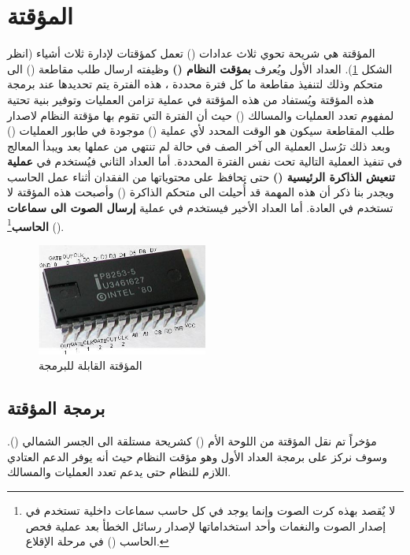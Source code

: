 \documentclass[document.tex]{subfiles}
\begin{document}
\section{المؤقتة }
المؤقتة هي شريحة  تحوي ثلاث عدادات () تعمل كمؤقتات لإدارة ثلاث أشياء (انظر الشكل \ref{fig:pit}). العداد الأول ويُعرف \textbf{بمؤقت النظام ()} وظيفته ارسال طلب مقاطعة () الى متحكم  وذلك لتنفيذ مقاطعة ما كل فترة محددة ، هذه الفترة يتم تحديدها عند برمجة هذه المؤقتة ويُستفاد من هذه المؤقتة في عملية تزامن العمليات وتوفير بنية تحتية لمفهوم تعدد العمليات والمسالك () حيث أن الفترة التي تقوم بها مؤقتة النظام لاصدار طلب المقاطعة سيكون هو الوقت المحدد لأي عملية () موجودة في طابور العمليات () وبعد ذلك ترُسل العملية الى آخر الصف في حالة لم تنتهي من عملها بعد ويبدأ المعالج في تنفيذ العملية التالية تحت نفس الفترة المحددة.  أما العداد الثاني فيُستخدم في \textbf{عملية تنعيش الذاكرة الرئيسية ()} حتى تحافظ على محتوياتها من الفقدان أثناء عمل الحاسب ويجدر بنا ذكر أن هذه المهمة قد أُحيلت الى متحكم الذاكرة () وأصبحت هذه المؤقتة لا تستخدم في العادة. أما العداد الأخير فيستخدم في عملية \textbf{إرسال الصوت الى سماعات الحاسب}\footnote{لا يٌقصد بهذه كرت الصوت وإنما يوجد في كل حاسب سماعات داخلية تستخدم في إصدار الصوت والنغمات وأحد استخداماتها لإصدار رسائل الخطأ بعد عملية فحص الحاسب () في مرحلة الإقلاع.} ().

\begin{figure}[h!]
  \label{fig:pit} 
  \caption{المؤقتة القابلة للبرمجة }
  \centering
   \includegraphics[width=0.5\textwidth]{../img/Intel-P8253-5}
\end{figure}

\subsection{برمجة المؤقتة }
مؤخراً تم نقل المؤقتة من اللوحة الأم () كشريحة  مستلقة الى الجسر الشمالي (). وسوف نركز على برمجة العداد الأول وهو مؤقت النظام حيث أنه يوفر الدعم العتادي اللازم للنظام حتى يدعم تعدد العمليات والمسالك.
\end{document}
